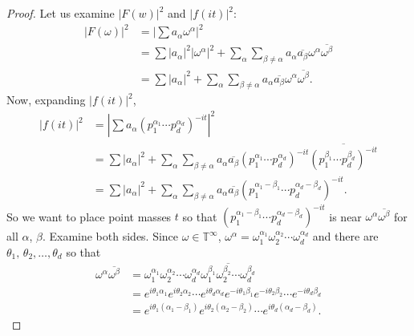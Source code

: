 \documentclass[]{elsarticle}
\newcommand{\T}{\mathbb{T}}
\numberwithin{equation}{section}
\begin{document}
\begin{proof}
        Let us examine $|F(w)|^2$ and $|f(it)|^2$: 
          \begin{align} \label{bigF}
            |F(\omega)|^2 &= \left| \sum a_{\alpha} \omega^\alpha \right|^2 \nonumber\\
                        &= \sum \left| a_{\alpha} \right|^2 \left|\omega^\alpha\right|^2 
                          + \sum_\alpha\sum_{\beta \neq \alpha} a_\alpha \overline{a_\beta} \omega^\alpha \overline{\omega^\beta}\nonumber\\
                        &= \sum \left| a_{\alpha} \right|^2  
                          + \sum_\alpha\sum_{\beta \neq \alpha} a_\alpha \overline{a_\beta} \omega^\alpha \overline{\omega^\beta}.
          \end{align}
        Now, expanding $|f(it)|^2$,
          \begin{align} \label{littlef}
            |f(it)|^2 &= \left| \sum a_\alpha (p_1^{\alpha_1}\cdots p_d^{\alpha_d})^{-it}\right|^2 \nonumber\\
                            &= \sum \left| a_{\alpha} \right|^2 
                              + \sum_\alpha\sum_{\beta \neq \alpha} a_\alpha \overline{a_\beta} (p_1^{\alpha_1}\cdots p_d^{\alpha_d})^{-it} \overline{(p_1^{\beta_1}\cdots p_d^{\beta_d})^{-it}} \nonumber\\
                            &= \sum \left| a_{\alpha} \right|^2  
                              + \sum_\alpha\sum_{\beta \neq \alpha} a_\alpha \overline{a_\beta} (p_1^{\alpha_1-\beta_1}\cdots p_d^{\alpha_d-\beta_d})^{-it}.
          \end{align}
        So we want to place point masses $t$ so that $(p_1^{\alpha_1-\beta_1}\cdots p_d^{\alpha_d-\beta_d})^{-it}$ is near $\omega^\alpha \overline{\omega^\beta}$ for all $\alpha$, $\beta$. Examine both sides. Since $\omega \in \T^{\infty}$, $\omega^\alpha = \omega_1^{\alpha_1} \omega_2^{\alpha_2} \cdots \omega_d^{\alpha_d}$ and there are $\theta_1,\, \theta_2, \dots , \theta_d$ so that 
          \begin{align*}
            \omega^\alpha \overline{\omega^\beta} 
                &= \omega_1^{\alpha_1} \omega_2^{\alpha_2} \dotsm \omega_d^{\alpha_d} \overline{\omega_1^{\beta_1} \omega_2^{\beta_2} \dotsm \omega_d^{\beta_d}}\\
                &= e^{i\theta_1 \alpha_1} e^{i\theta_2 \alpha_2} \dotsm e^{i\theta_d \alpha_d} e^{-i\theta_1 \beta_1} e^{-i\theta_2 \beta_2} \dotsm e^{-i\theta_d \beta_d}\\
                &= e^{i\theta_1 (\alpha_1-\beta_1)} e^{i\theta_2 (\alpha_2-\beta_2)} \dotsm e^{i\theta_d (\alpha_d-\beta_d)}.

\end{align*}
\end{proof}
\end{document}
